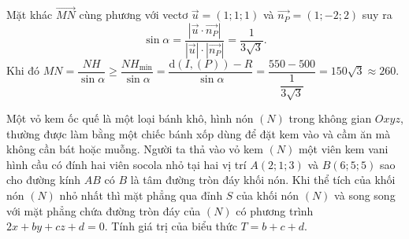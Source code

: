 \begin{ex}
{{
		}
		\noindent
		Mặt khác $\overrightarrow{MN}$ cùng phương với vectơ $\overrightarrow{u}=\left(1;1;1\right)$ và $\overrightarrow{n_P}=(1;-2;2)$ suy ra 
		\[
		\sin \alpha=\dfrac{\left|\overrightarrow{u}\cdot \overrightarrow{n_P}\right|}{\left|\overrightarrow{u}\right|\cdot \left|\overrightarrow{n_P}\right|}=\dfrac{1}{3\sqrt{3}}.
		\]
		Khi đó $MN=\dfrac{NH}{\sin \alpha} \ge \dfrac{NH_{\min}}{\sin \alpha}=\dfrac{\mathrm{d}\left(I,(P)\right)-R}{\sin \alpha}=\dfrac{550-500}{\dfrac{1}{3\sqrt{3}}}=150\sqrt{3} \approx 260$.
	}
\end{ex}

\begin{ex}%
	Một vỏ kem ốc quế là một loại bánh khô, hình nón $(N)$ trong không gian $Oxyz$, thường được làm bằng một chiếc bánh xốp dùng để đặt kem vào và cầm ăn mà không cần bát hoặc muỗng. Người ta thả vào vỏ kem $(N)$ một viên kem vani hình cầu có đính hai viên socola nhỏ tại hai vị trí $A(2; 1; 3)$ và $B(6; 5; 5)$ sao cho đường kính $AB$ có $B$ là tâm đường tròn đáy khối nón. Khi thể tích của khối nón $(N)$ nhỏ nhất thì mặt phẳng qua đỉnh $S$ của khối nón $(N)$ và song song với mặt phẳng chứa đường tròn đáy của $(N)$ có phương trình $2x+by+cz+d=0$. Tính giá trị của biểu thức $T=b+c+d$.\\
\end{ex}
